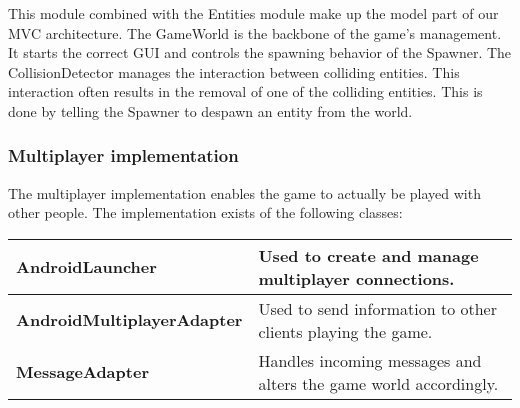 {This module combined with the Entities module make up the model part of our MVC architecture. The GameWorld is the backbone of the game's management. It starts the correct GUI and controls the spawning behavior of the Spawner. The CollisionDetector manages the interaction between colliding entities. This interaction often results in the removal of one of the colliding entities. This is done by telling the Spawner to despawn an entity from the world. 










\subsubsection{Multiplayer implementation}
The multiplayer implementation enables the game to actually be played with other people. The implementation exists of the following classes:\\

\begin{tabular}{| l | l |} 
\hline
\textbf{AndroidLauncher} & Used to create and manage multiplayer connections. \\ \hline
\textbf{AndroidMultiplayerAdapter} & Used to send information to other clients playing the game. \\ \hline
\textbf{MessageAdapter} & Handles incoming messages and alters the game world accordingly. \\ \hline
\end{tabular}  \\ \\

}
